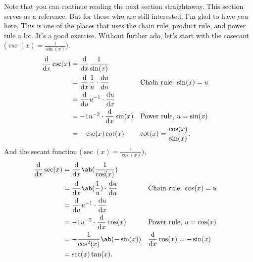 Note that you can continue reading the next section straightaway. This section serves as a reference. But for those who are still interested, I'm glad to have you here. This is one of the places that uses the chain rule, product rule, and power rule a lot. It's a good exercise. Without further ado, let's start with the cosecant (\(\csc(x) = \frac{1}{\sin(x)}\)).
\begin{align}
  \odv*{\csc(x)}{x} & = \odv*{\frac{1}{\sin(x)}}{x}                                                                 \\
                    & = \odv*{\frac{1}{u}}{x} \cdot \odv{u}{u} &  & \textrm{Chain rule: \(\sin(x) = u\)}            \\
                    & = \odv*{u^{-1}}{u} \cdot \odv{u}{x}                                                           \\
                    & = -1u^{-2}\cdot\odv*{\sin(x)}{x}         &  & \textrm{Power rule, \(u = \sin(x)\)}            \\
                    & = -\csc(x)\cot(x)                        &  & \textrm{\(\cot(x) = \frac{\cos(x)}{\sin(x)}\)}.
\end{align}
And the secant function (\(\sec(x) = \frac{1}{\cos(x)}\)),
\begin{align}
  \odv*{\sec(x)}{x} & = \odv*{\ab(\frac{1}{\cos(x)})}{x}                                                           \\
                    & = \odv*{\ab(\frac{1}{u})}{x} \cdot \odv{u}{u} &  & \textrm{Chain rule: \(\cos(x) = u\)}      \\
                    & = \odv*{u^{-1}}{u} \cdot \odv{u}{x}                                                          \\
                    & = -1u^{-2}\cdot\odv*{\cos(x)}{x}              &  & \textrm{Power rule, \(u = \cos(x)\)}      \\
                    & = -\frac{1}{\cos^{2}(x)}\ab(-\sin(x))         &  & \textrm{\(\odv*{\cos(x)}{x} = -\sin(x)\)} \\
                    & = \sec(x)\tan(x).
\end{align}


